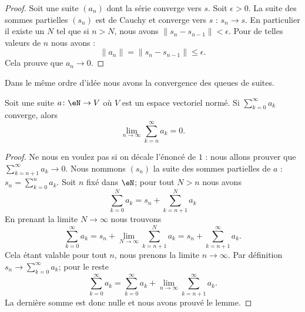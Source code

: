 \begin{proof}
	Soit une suite \( (a_n)\) dont la série converge vers \( s\). Soit \( \epsilon>0\). La suite des sommes partielles \( (s_n)\) est de Cauchy et converge vers \( s\) : \( s_n\to s\). En particulier il existe un \( N\) tel que si \( n>N\), nous avons \( \| s_n-s_{n-1} \|<\epsilon\). Pour de telles valeurs de \( n\) nous avons :
	\begin{equation}
		\| a_n \|=\| s_n-s_{n-1} \|\leq \epsilon.
	\end{equation}
	Cela prouve que \( a_n\to 0\).
\end{proof}

Dans le même ordre d'idée nous avons la convergence des queues de suites.

\begin{lemma}       \label{LEMooFUCOooCOqLRj}
	Soit une suite \( a\colon \eN\to V\) où \( V\) est un espace vectoriel normé. Si \( \sum_{k=0}^{\infty}a_k\) converge, alors
	\begin{equation}
		\lim_{n\to \infty} \sum_{k=n}^{\infty}a_k=0.
	\end{equation}
\end{lemma}

\begin{proof}
	Ne nous en voulez pas si on décale l'énoncé de \( 1\) : nous allons prouver que \( \sum_{k=n+1}^{\infty}a_k\to 0\). Nous nommons \( (s_n)\) la suite des sommes partielles de \( a\) : \( s_n=\sum_{k=0}^na_k\). Soit \( n\) fixé dans \( \eN\); pour tout \( N>n\) nous avons
	\begin{equation}
		\sum_{k=0}^Na_k=s_n+\sum_{k=n+1}^Na_k
	\end{equation}
	En prenant la limite \( N\to \infty\) nous trouvons
	\begin{equation}
		\sum_{k=0}^{\infty}a_k=s_n+\lim_{N\to \infty} \sum_{k=n+1}^Na_k=s_n+\sum_{k=n+1}^{\infty}a_k.
	\end{equation}
	Cela étant valable pour tout \( n\), nous prenons la limite \( n\to\infty\). Par définition \( s_n\to\sum_{k=0}^{\infty}a_k\); pour le reste
	\begin{equation}
		\sum_{k=0}^{\infty}a_k=\sum_{k=0}^{\infty}a_k+\lim_{n\to \infty} \sum_{k=n+1}^{\infty}a_k.
	\end{equation}
	La dernière somme est donc nulle et nous avons prouvé le lemme.
\end{proof}

